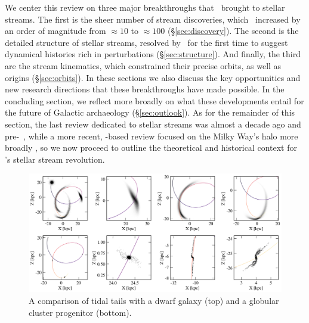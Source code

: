 \documentclass[final,5p,times,twocolumn,authoryear]{elsarticle}
\begin{document}
We center this review on three major breakthroughs that \gaia\ brought to stellar streams.
The first is the sheer number of stream discoveries, which \gaia\ increased by an order of magnitude from $\approx10$ to $\approx100$ (\S\ref{sec:discovery}).
The second is the detailed structure of stellar streams, resolved by \gaia\ for the first time to suggest dynamical histories rich in perturbations (\S\ref{sec:structure}).
And finally, the third are the stream kinematics, which constrained their precise orbits, as well as origins (\S\ref{sec:orbits}).
In these sections we also discuss the key opportunities and new research directions that these breakthroughs have made possible.
In the concluding section, we reflect more broadly on what these developments entail for the future of Galactic archaeology (\S\ref{sec:outlook}).
As for the remainder of this section, the last review dedicated to stellar streams was almost a decade ago and pre-\gaia\ \citep{newberg:2016}, while a more recent, \gaia-based review focused on the Milky Way's halo more broadly \citep{helmi:2020}, so we now proceed to outline the theoretical and historical context for \gaia's stellar stream revolution.

\begin{figure}[t!]
\begin{center}
\includegraphics[width=1\textwidth]{figures/stream_formation.png}
\end{center}
\caption{%
A comparison of tidal tails with a dwarf galaxy (top) and a globular cluster progenitor (bottom).
\label{fig:stream_formation}
}
\end{figure}
\end{document}

